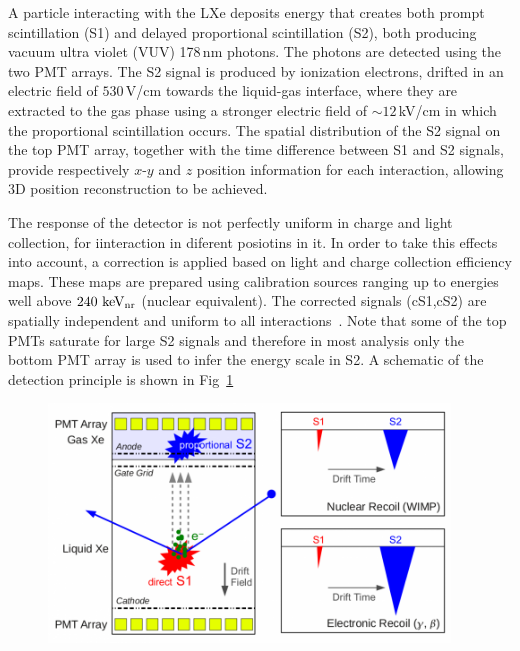 A particle interacting with the LXe deposits energy that creates both
prompt scintillation (S1) and delayed proportional scintillation (S2), both  producing vacuum ultra violet (VUV) 178\,nm photons. The photons are detected using the two PMT arrays. The S2 signal is produced by ionization electrons, drifted in an electric field of $530$\,V/cm towards the liquid-gas interface, where they are extracted to the gas phase using a stronger electric field of $\sim12$\,kV/cm in which the proportional scintillation occurs. 
The spatial distribution of the S2 signal on the top PMT array, together with the time difference between S1 and S2 signals, provide respectively $x$-$y$ and $z$ position information for each interaction, allowing 3D position reconstruction to be achieved.

The response of the detector is not perfectly uniform in charge and light collection, for iinteraction in diferent posiotins in it. In order to take this effects into account, a correction is applied based on light and charge collection efficiency maps. These maps are prepared using calibration sources ranging up to energies well above $240~\mathrm{keV_\mathrm{nr}}$ (nuclear equivalent). The corrected signals (cS1,cS2) are spatially independent and uniform to all interactions~\cite{xe100_instr2012}. Note that some of the top PMTs saturate for large S2 signals and therefore in most analysis only the bottom PMT array is used to infer the energy scale in S2. A schematic of the detection principle is shown in Fig~\ref{fig:xe100TPC}

\begin{figure}[]
	\centering
	\includegraphics[width=0.95\textwidth]{figs/xe100TPC.png}
	\label{fig:xe100TPC}
\end{figure}

